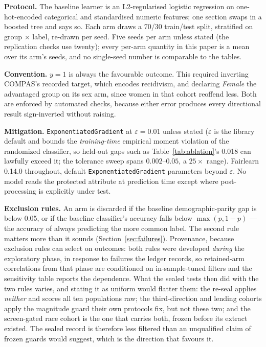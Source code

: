 \documentclass[9pt,conference]{IEEEtran}
\begin{document}
\textbf{Protocol.} The baseline learner is an L2-regularised logistic regression on
one-hot-encoded categorical and standardised numeric features; one section swaps in a
boosted tree and says so. Each arm draws a 70/30 train/test split, stratified on group
$\times$ label, re-drawn per seed. Five seeds per arm unless stated (the replication
checks use twenty); every per-arm quantity in this paper is a mean over its arm's seeds,
and no single-seed number is comparable to the tables.

\textbf{Convention.} $y = 1$ is always the favourable outcome. This required inverting COMPAS's
recorded target, which encodes recidivism, and declaring \emph{Female} the advantaged group on
its sex arm, since women in that cohort reoffend less. Both are enforced by automated checks,
because either error produces every directional result sign-inverted without raising.

\textbf{Mitigation.} \texttt{ExponentiatedGradient} \cite{agarwal2018} at $\varepsilon = 0.01$
unless stated ($\varepsilon$ is the library default and bounds the \emph{training-time}
empirical moment violation of the randomized classifier, so held-out gaps such as
Table~\ref{tab:ablation}'s 0.018 can lawfully exceed it; the tolerance sweep spans
$0.002$--$0.05$, a $25\times$ range). Fairlearn 0.14.0 throughout, default
\texttt{ExponentiatedGradient} parameters beyond $\varepsilon$. No model reads the protected attribute at prediction time except where
post-processing is explicitly under test.

\textbf{Exclusion rules.} An arm is discarded if the baseline demographic-parity gap is below
0.05, or if the baseline classifier's accuracy falls below $\max(p, 1-p)$ --- the accuracy of
always predicting the more common label. The second rule matters more than it sounds
(Section~\ref{sec:failures}). Provenance, because exclusion rules can select on outcomes:
both rules were developed \emph{during} the exploratory phase, in response to failures the
ledger records, so retained-arm correlations from that phase are conditioned on
in-sample-tuned filters and the sensitivity table reports the dependence. What the sealed
tests then did with the two rules varies, and stating it as uniform would flatter them: the
re-seal applies \emph{neither} and scores all ten populations raw; the third-direction and
lending cohorts apply the magnitude guard their own protocols fix, but not these two; and
the screen-gated race cohort is the one that carries both, frozen before its extract
existed. The sealed record is therefore less filtered than an unqualified claim of frozen
guards would suggest, which is the direction that favours it.
\end{document}
